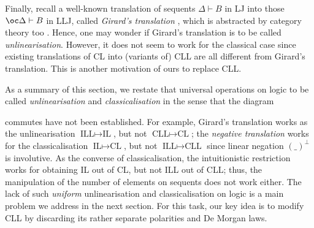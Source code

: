 \documentclass[a4paper]{article}
\theoremstyle{definition}
\theoremstyle{theorem}
\theoremstyle{remark}
\begin{document}

Finally, recall a well-known translation of sequents $\Delta \vdash B$ in \textsf{LJ} into those $\oc \Delta \vdash B$ in \textsf{LLJ}, called \emph{Girard's translation} \cite{girard1987linear}, which is abstracted by category theory too \cite{seely1987linear}.
Hence, one may wonder if Girard's translation is to be called \emph{unlinearisation}.
However, it does not seem to work for the classical case since existing translations of CL into (variants of) CLL \cite{girard1987linear,girard1993unity,laurent2003translations} are all different from Girard's translation.
This is another motivation of ours to replace CLL.

As a summary of this section, we restate that universal operations on logic to be called \emph{unlinearisation} and \emph{classicalisation} in the sense that the diagram
\begin{mathpar}
\end{mathpar}
commutes have not been established.
For example, Girard's translation works as the unlinearisation $\text{ILL} \mapsto \text{IL}$, but not $\text{CLL} \mapsto \text{CL}$; the \emph{negative translation} \cite{troelstra2000basic} works for the classicalisation $\text{IL} \mapsto \text{CL}$, but not $\text{ILL} \mapsto \text{CLL}$ since linear negation $(\_)^\bot$ is involutive.
As the converse of classicalisation, the intuitionistic restriction works for obtaining IL out of CL, but not ILL out of CLL; thus, the manipulation of the number of elements on sequents does not work either.
The lack of such \emph{uniform} unlinearisation and classicalisation on logic is a main problem we address in the next section.
For this task, our key idea is to modify CLL by discarding its rather separate polarities and De Morgan laws.
\end{document}
